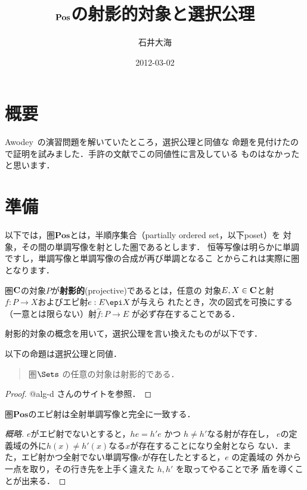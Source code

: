 \documentclass[a4j]{ltjsarticle}
\title{$\Pos$の射影的対象と選択公理}
\author{石井大海}
\date{2012-03-02}
\newcommand{\Pos}{\mathbf{Pos}}
\begin{document}
\maketitle
\section{概要}
Awodey~\cite{Awodey:2010}の演習問題を解いていたところ，選択公理と同値な
命題を見付けたので証明を試みました．手許の文献でこの同値性に言及している
ものはなかったと思います．
\section{準備}
以下では，圏$\Pos$とは，半順序集合（partially ordered set，以下poset）を
対象，その間の単調写像を射とした圏であるとします．
恒等写像は明らかに単調ですし，単調写像と単調写像の合成が再び単調となるこ
とからこれは実際に圏となります．

\begin{definition}[射影的]
 圏${\bf C}$の対象$P$が{\bfseries 射影的}(projective)であるとは，任意の
 対象$E, X \in {\bf C}$と射$f: P \to X$およびエピ射$e: E \epi X$が与えら
 れたとき，次の図式を可換にする（一意とは限らない）射$\hat{f}: P \to E$
 が必ず存在することである．

 \begin{center}
 \end{center}
\end{definition}

射影的対象の概念を用いて，選択公理を言い換えたものが以下です．
\begin{theorem}\label{projective}
 以下の命題は選択公理と同値．
 \begin{quotation}
  圏$\Sets$ の任意の対象は射影的である．
 \end{quotation}
\end{theorem}
\begin{proof}
 @alg-d さんのサイト\cite{alg-d}を参照．
\end{proof}

\begin{theorem}\label{epi and surj}
 圏$\Pos$のエピ射は全射単調写像と完全に一致する．
\end{theorem}
\begin{proof}[概略]
 $e$がエピ射でないとすると，$he = h'e$ かつ $h \neq h'$なる射が存在し，
 $e$の定義域の外に$h(x) \neq h'(x)$なる$x$が存在することになり全射となら
 ない．また，エピ射かつ全射でない単調写像$e$が存在したとすると，$e$ の定義域の
 外から一点を取り，その行き先を上手く違えた $h, h'$ を取ってやることで矛
 盾を導くことが出来る．
\end{proof}
\end{document}
